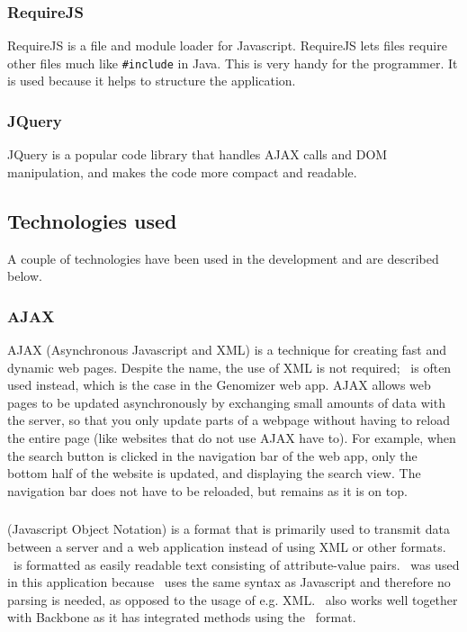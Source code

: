 \subsubsection{RequireJS}
RequireJS\cite{web_5} is a file and module loader for Javascript. RequireJS lets files require other files much like \texttt{\#include} in Java. This is very handy for the programmer. It is used because it helps to structure the application.

\subsubsection{JQuery}
JQuery\cite{web_6} is a popular code library that handles AJAX calls and DOM manipulation, and makes the code more compact and readable.


\subsection{Technologies used}
A couple of technologies have been used in the development and are described below.

\subsubsection{AJAX}
AJAX\cite{web_3} (Asynchronous Javascript and XML) is a technique for creating fast and dynamic web pages. Despite the name, the use of XML is not required; \json\ is often used instead, which is the case in the Genomizer web app. AJAX allows web pages to be updated asynchronously by exchanging small amounts of data with the server, so that you only update parts of a webpage without having to reload the entire page (like websites that do not use AJAX have to). For example, when the search button is clicked in the navigation bar of the web app, only the bottom half of the website is updated, and displaying the search view. The navigation bar does not have to be reloaded, but remains as it is on top.

\subsubsection{\json}
\json\cite{web_4} (Javascript Object Notation) is a format that is primarily used to transmit data between a server and a web application instead of using XML or other formats.
\json\ is formatted as easily readable text consisting of attribute-value pairs.
\json\ was used in this application because \json\ uses the same syntax as Javascript and therefore no parsing is needed, as opposed to the usage of e.g. XML. \json\ also works well together with Backbone as it has integrated methods using the \json\ format.

